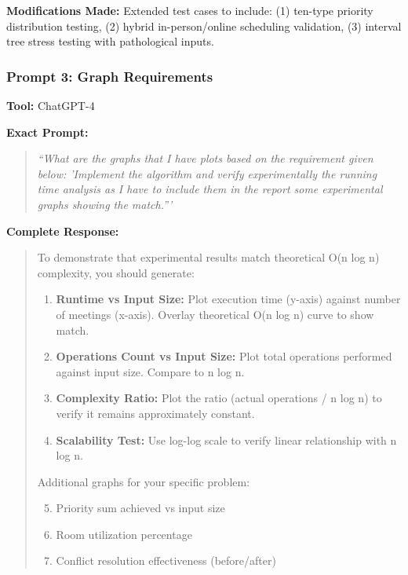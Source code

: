 \documentclass[conference]{IEEEtran}
\begin{document}
\textbf{Modifications Made:}
Extended test cases to include: (1) ten-type priority distribution testing, (2) hybrid in-person/online scheduling validation, (3) interval tree stress testing with pathological inputs.

\vspace{0.4cm}

\subsubsection{Prompt 3: Graph Requirements}

\textbf{Tool:} ChatGPT-4

\textbf{Exact Prompt:}
\begin{quote}
\textit{``What are the graphs that I have plots based on the requirement given below: 'Implement the algorithm and verify experimentally the running time analysis as I have to include them in the report some experimental graphs showing the match.'''}
\end{quote}

\textbf{Complete Response:}
\begin{quote}
\small
To demonstrate that experimental results match theoretical O(n log n) complexity, you should generate:
\begin{enumerate}
    \item \textbf{Runtime vs Input Size:} Plot execution time (y-axis) against number of meetings (x-axis). Overlay theoretical O(n log n) curve to show match.
    \item \textbf{Operations Count vs Input Size:} Plot total operations performed against input size. Compare to n log n.
    \item \textbf{Complexity Ratio:} Plot the ratio (actual operations / n log n) to verify it remains approximately constant.
    \item \textbf{Scalability Test:} Use log-log scale to verify linear relationship with n log n.
\end{enumerate}
Additional graphs for your specific problem:
\begin{enumerate}
    \setcounter{enumi}{4}
    \item Priority sum achieved vs input size
    \item Room utilization percentage
    \item Conflict resolution effectiveness (before/after)
\end{enumerate}
\end{quote}
\end{document}
